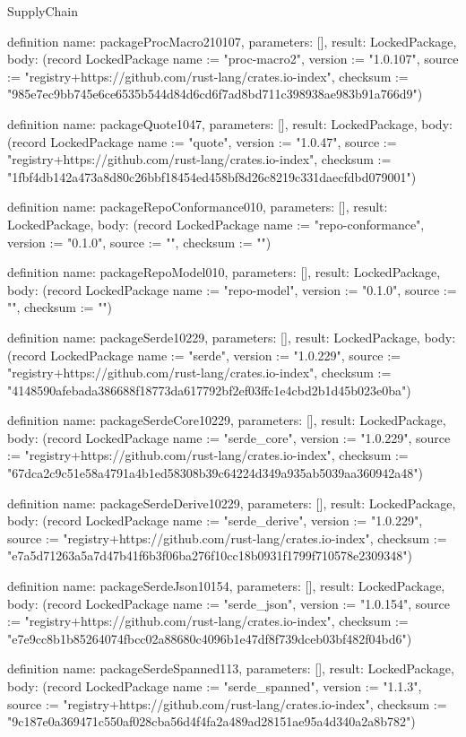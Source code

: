 \begin{lexlean}{SupplyChain}
\begin{semanticmodule}
definition{
  name: packageProcMacro210107,
  parameters: [],
  result: LockedPackage,
  body: (record LockedPackage {name := "proc-macro2", version := "1.0.107", source := "registry+https://github.com/rust-lang/crates.io-index", checksum := "985e7ec9bb745e6ce6535b544d84d6cd6f7ad8bd711c398938ae983b91a766d9"})
}

definition{
  name: packageQuote1047,
  parameters: [],
  result: LockedPackage,
  body: (record LockedPackage {name := "quote", version := "1.0.47", source := "registry+https://github.com/rust-lang/crates.io-index", checksum := "1fbf4db142a473a8d80c26bbf18454ed458bf8d26c8219c331daecfdbd079001"})
}

definition{
  name: packageRepoConformance010,
  parameters: [],
  result: LockedPackage,
  body: (record LockedPackage {name := "repo-conformance", version := "0.1.0", source := "", checksum := ""})
}

definition{
  name: packageRepoModel010,
  parameters: [],
  result: LockedPackage,
  body: (record LockedPackage {name := "repo-model", version := "0.1.0", source := "", checksum := ""})
}

definition{
  name: packageSerde10229,
  parameters: [],
  result: LockedPackage,
  body: (record LockedPackage {name := "serde", version := "1.0.229", source := "registry+https://github.com/rust-lang/crates.io-index", checksum := "4148590afebada386688f18773da617792bf2ef03ffc1e4cbd2b1d45b023e0ba"})
}

definition{
  name: packageSerdeCore10229,
  parameters: [],
  result: LockedPackage,
  body: (record LockedPackage {name := "serde_core", version := "1.0.229", source := "registry+https://github.com/rust-lang/crates.io-index", checksum := "67dca2c9c51e58a4791a4b1ed58308b39c64224d349a935ab5039aa360942a48"})
}

definition{
  name: packageSerdeDerive10229,
  parameters: [],
  result: LockedPackage,
  body: (record LockedPackage {name := "serde_derive", version := "1.0.229", source := "registry+https://github.com/rust-lang/crates.io-index", checksum := "e7a5d71263a5a7d47b41f6b3f06ba276f10cc18b0931f1799f710578e2309348"})
}

definition{
  name: packageSerdeJson10154,
  parameters: [],
  result: LockedPackage,
  body: (record LockedPackage {name := "serde_json", version := "1.0.154", source := "registry+https://github.com/rust-lang/crates.io-index", checksum := "e7e9cc8b1b85264074fbcc02a88680c4096b1e47df8f739dceb03bf482f04bd6"})
}

definition{
  name: packageSerdeSpanned113,
  parameters: [],
  result: LockedPackage,
  body: (record LockedPackage {name := "serde_spanned", version := "1.1.3", source := "registry+https://github.com/rust-lang/crates.io-index", checksum := "9c187e0a369471c550af028cba56d4f4fa2a489ad28151ae95a4d340a2a8b782"})
}


\end{semanticmodule}
\end{lexlean}
